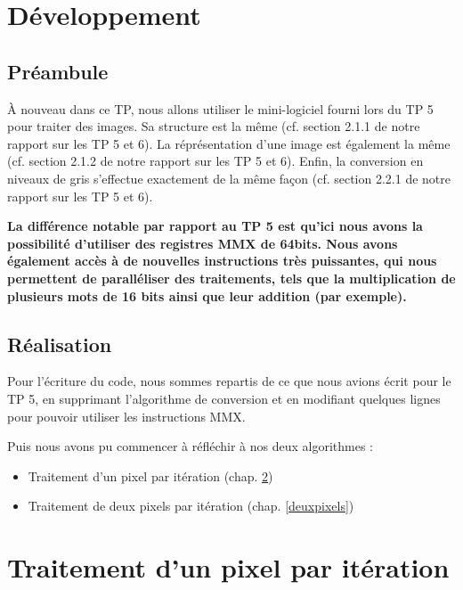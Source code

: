 \chapter{Développement}
\section{Préambule}
À nouveau dans ce TP, nous allons utiliser le mini-logiciel fourni lors du TP 5 pour traiter des images. Sa structure est la même (cf. section 2.1.1 de notre rapport sur les TP 5 et 6). La réprésentation d'une image est également la même (cf. section 2.1.2 de notre rapport sur les TP 5 et 6). Enfin, la conversion en niveaux de gris s'effectue exactement de la même façon (cf. section 2.2.1 de notre rapport sur les TP 5 et 6).

\medskip

\textbf{La différence notable par rapport au TP 5 est qu'ici nous avons la possibilité d'utiliser des \og registres\fg{} MMX de 64bits. Nous avons également accès à de nouvelles instructions très puissantes, qui nous permettent de paralléliser des traitements, tels que la multiplication de plusieurs mots de 16 bits ainsi que leur addition (par exemple).}

\section{Réalisation}
Pour l'écriture du code, nous sommes repartis de ce que nous avions écrit pour le TP 5, en supprimant l'algorithme de conversion et en modifiant quelques lignes pour pouvoir utiliser les instructions MMX.

\medskip

Puis nous avons pu commencer à réfléchir à nos deux algorithmes :
\begin{itemize}
  \item Traitement d'un pixel par itération (chap. \ref{unpixel})
  \item Traitement de deux pixels par itération (chap. \ref{deuxpixels})
\end{itemize}

\chapter{Traitement d'un pixel par itération}
\label{unpixel}
